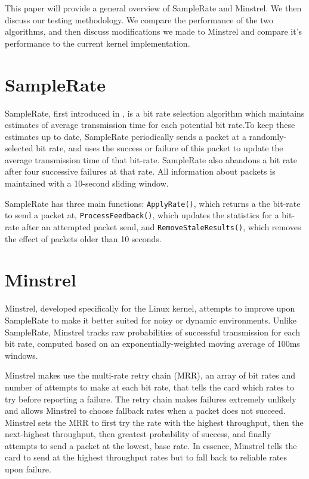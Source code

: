 \documentclass[twocolumn,10pt]{article}
\begin{document}
This paper will provide a general overview of SampleRate and Minstrel.
We then discuss our testing methodology.  We compare the performance
of the two algorithms, and then discuss modifications we made to
Minstrel and compare it's performance to the current kernel
implementation.


\section{SampleRate}

SampleRate, first introduced in \cite{samplerate}, is a bit rate
selection algorithm which maintains estimates of average transmission
time for each potential bit rate.To keep these estimates up to date,
SampleRate periodically sends a packet at a randomly-selected bit
rate, and uses the success or failure of this packet to update the
average transmission time of that bit-rate.  SampleRate also abandons
a bit rate after four successive failures at that rate.  All
information about packets is maintained with a 10-second sliding window.

SampleRate has three main functions: \texttt{ApplyRate()}, which
returns a the bit-rate to send a packet at,
\texttt{ProcessFeedback()}, which updates the statistics for a
bit-rate after an attempted packet send, and
\texttt{RemoveStaleResults()}, which removes the effect of packets
older than 10 seconds.

\section{Minstrel}

Minstrel, developed specifically for the Linux kernel, attempts to
improve upon SampleRate to make it better suited for noisy or
dynamic environments.  Unlike SampleRate, Minstrel tracks raw
probabilities of successful transmission for each bit rate, computed
based on an exponentially-weighted moving average of 100ms windows.

Minstrel makes use the multi-rate retry chain (MRR), an array of bit rates
and number of attempts to make at each bit rate, that tells the card
which rates to try before reporting a failure.  The retry chain makes
failures extremely unlikely and allows Minstrel to choose fallback
rates when a packet does not succeed.  Minstrel sets the MRR to first
try the rate with the highest throughput, then the next-highest
throughput, then greatest probability of success, and finally attempts
to send a packet at the lowest, base rate.  In essence, Minstrel tells
the card to send at the highest throughput rates but to fall back to
reliable rates upon failure.
\end{document}
